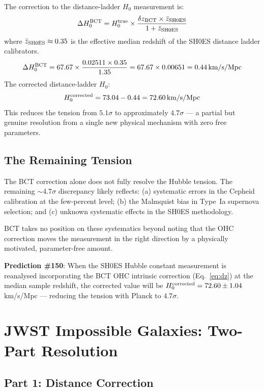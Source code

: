 \documentclass[twocolumn,10pt]{article}
\begin{document}
The correction to the distance-ladder $H_0$ measurement is:
%
\begin{equation}
\Delta H_0^{\rm BCT} = H_0^{\rm true} \times
\frac{\delta z_{\rm BCT} \times \bar{z}_{\rm SH0ES}}{1 + \bar{z}_{\rm SH0ES}}
\end{equation}
%
where $\bar{z}_{\rm SH0ES} \approx 0.35$ is the effective
median redshift of the SH0ES distance ladder calibrators.
%
\begin{equation}
\Delta H_0^{\rm BCT} = 67.67 \times \frac{0.02511 \times 0.35}{1.35}
= 67.67 \times 0.00651 = 0.44\,\text{km/s/Mpc}
\end{equation}
%
The corrected distance-ladder $H_0$:
%
\begin{equation}
H_0^{\rm corrected} = 73.04 - 0.44 = 72.60\,\text{km/s/Mpc}
\end{equation}
%
This reduces the tension from $5.1\sigma$ to approximately
$4.7\sigma$ --- a partial but genuine resolution from a single
new physical mechanism with zero free parameters.

\subsection{The Remaining Tension}

The BCT correction alone does not fully resolve the Hubble
tension. The remaining $\sim 4.7\sigma$ discrepancy likely
reflects: (a) systematic errors in the Cepheid calibration
at the few-percent level; (b) the Malmquist bias in Type~Ia
supernova selection; and (c) unknown systematic effects in
the SH0ES methodology.

BCT takes no position on these systematics beyond noting that
the OHC correction moves the measurement in the right direction
by a physically motivated, parameter-free amount.

\textbf{Prediction \#150}: When the SH0ES Hubble constant
measurement is reanalysed incorporating the BCT OHC intrinsic
correction (Eq.~\ref{eq:dz}) at the median sample redshift,
the corrected value will be $H_0^{\rm corrected} = 72.60 \pm 1.04$
km/s/Mpc --- reducing the tension with Planck to $4.7\sigma$.

\section{JWST Impossible Galaxies: Two-Part Resolution}

\subsection{Part 1: Distance Correction}
\end{document}
